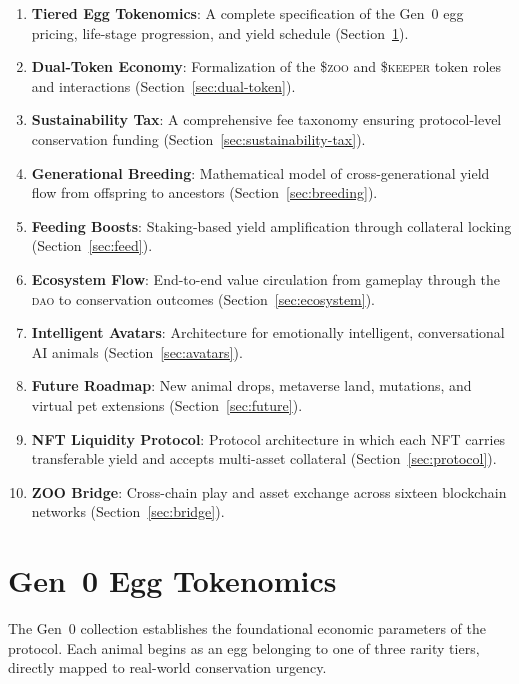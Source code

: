 \documentclass[11pt,letterpaper]{article}
\newcommand{\DAO}{\textsc{dao}}
\newcommand{\ZOO}{\$\textsc{zoo}}
\newcommand{\KEEPER}{\$\textsc{keeper}}
\begin{document}
\begin{enumerate}
    \item \textbf{Tiered Egg Tokenomics}: A complete specification of the Gen~0 egg pricing, life-stage progression, and yield schedule (Section~\ref{sec:tokenomics}).
    \item \textbf{Dual-Token Economy}: Formalization of the \ZOO{} and \KEEPER{} token roles and interactions (Section~\ref{sec:dual-token}).
    \item \textbf{Sustainability Tax}: A comprehensive fee taxonomy ensuring protocol-level conservation funding (Section~\ref{sec:sustainability-tax}).
    \item \textbf{Generational Breeding}: Mathematical model of cross-generational yield flow from offspring to ancestors (Section~\ref{sec:breeding}).
    \item \textbf{Feeding Boosts}: Staking-based yield amplification through collateral locking (Section~\ref{sec:feed}).
    \item \textbf{Ecosystem Flow}: End-to-end value circulation from gameplay through the \DAO{} to conservation outcomes (Section~\ref{sec:ecosystem}).
    \item \textbf{Intelligent Avatars}: Architecture for emotionally intelligent, conversational AI animals (Section~\ref{sec:avatars}).
    \item \textbf{Future Roadmap}: New animal drops, metaverse land, mutations, and virtual pet extensions (Section~\ref{sec:future}).
    \item \textbf{NFT Liquidity Protocol}: Protocol architecture in which each NFT carries transferable yield and accepts multi-asset collateral (Section~\ref{sec:protocol}).
    \item \textbf{ZOO Bridge}: Cross-chain play and asset exchange across sixteen blockchain networks (Section~\ref{sec:bridge}).
\end{enumerate}

\section{Gen~0 Egg Tokenomics}
\label{sec:tokenomics}

The Gen~0 collection establishes the foundational economic parameters of the protocol.  Each animal begins as an egg belonging to one of three rarity tiers, directly mapped to real-world conservation urgency.
\end{document}
